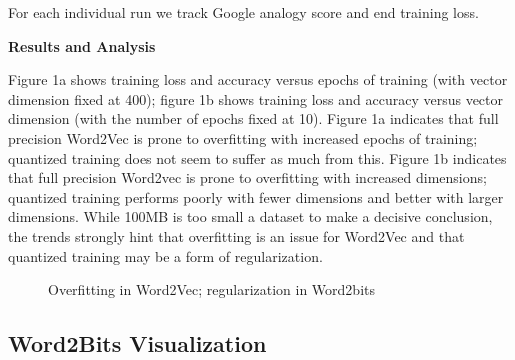 \documentclass{article} %
\begin{document}
For each individual run we track Google analogy score and end training loss.

\textbf{Results and Analysis}

Figure 1a shows training loss and accuracy versus epochs of training
(with vector dimension fixed at 400); figure 1b shows training loss
and accuracy versus vector dimension (with the number of epochs fixed
at 10). Figure 1a indicates that full precision Word2Vec is prone to overfitting with
increased epochs of training; quantized training does not seem to
suffer as much from this. Figure 1b indicates that full precision Word2vec is prone
to overfitting with increased dimensions; quantized training performs
poorly with fewer dimensions and better with larger dimensions. While
100MB is too small a dataset to make a decisive conclusion, the trends
strongly hint that overfitting is an issue for Word2Vec and that
quantized training may be a form of regularization.

\begin{figure}%
    \centering
    \qquad
    \caption{Overfitting in Word2Vec; regularization in Word2bits}%
    \label{fig:overfitting}
\end{figure}

\subsection{Word2Bits Visualization}
\end{document}
